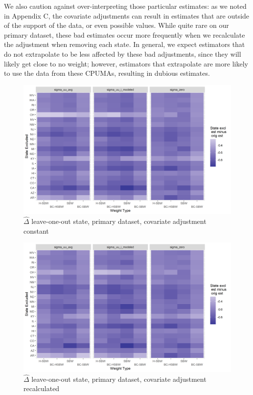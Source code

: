 \documentclass{article}
\begin{document}
\begin{appendix}
We also caution against over-interpreting those particular estimates: as we noted in Appendix C, the covariate adjustments can result in estimates that are outside of the support of the data, or even possible values. While quite rare on our primary dataset, these bad estimates occur more frequently when we recalculate the adjustment when removing each state. In general, we expect estimators that do not extrapolate to be less affected by these bad adjustments, since they will likely get close to no weight; however, estimators that extrapolate are more likely to use the data from these CPUMAs, resulting in dubious estimates. 

\begin{figure}[]
\begin{center}
    \caption{$\hat{\Delta}$ leave-one-out state, primary dataset, covariate adjustment constant}
    \label{fig:rdiffc1state}
    \includegraphics[scale=0.6]{01_Plots/loostate-repub-sensitivityc1-state-main.png}
\end{center}
\end{figure}

\begin{figure}[]
\begin{center}
    \caption{$\hat{\Delta}$ leave-one-out state, primary dataset, covariate adjustment recalculated}
    \label{fig:rdiffc1proc}
    \includegraphics[scale=0.6]{01_Plots/loostate-repub-sensitivityc1-proc-main.png}
\end{center}
\end{figure}


\end{appendix}
\end{document}
